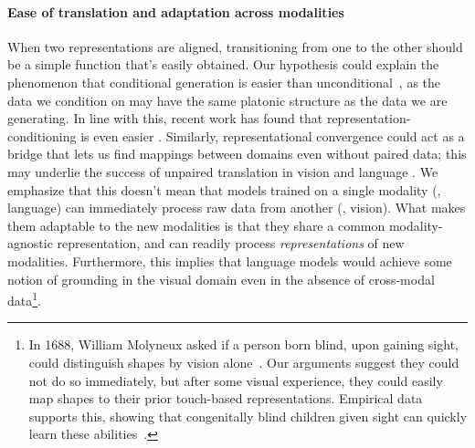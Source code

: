 \documentclass{article}
\theoremstyle{plain}
\theoremstyle{definition}
\theoremstyle{remark}
\begin{document}
\paragraph{Ease of translation and adaptation across modalities}
When two representations are aligned, transitioning from one to the other should be a simple function that's easily obtained. Our hypothesis could explain the phenomenon that conditional generation is easier than unconditional~\citep{mirza2014conditional,liu2020selfconditioned,sauer2022styleganxl}, as the data we condition on may have the same platonic structure as the data we are generating. In line with this, recent work has found that representation-conditioning is even easier \citep{RCG2023}. Similarly, representational convergence could act as a bridge that lets us find mappings between domains even without paired data; this may underlie the success of unpaired translation in vision \citep{CycleGAN2017,shi2024diffusion,xie2022unsupervised} and language \citep{tranfeature2017tran,lample-etal-2018-phrase}. 
We emphasize that this doesn't mean that models trained on a single modality (\eg, language) can immediately process raw data from another (\eg, vision). What makes them adaptable to the new modalities is that they share a common modality-agnostic representation, and can readily process \emph{representations} of new modalities. 
Furthermore, this implies that language models would achieve some notion of grounding in the visual domain %
even in the absence of cross-modal data\footnote{
In 1688, William Molyneux asked if a person born blind, upon gaining sight, could distinguish shapes by vision alone~\citep{locke_molyneaux}. Our arguments suggest they could not do so immediately, but after some visual experience, they could easily map shapes to their prior touch-based representations. Empirical data supports this, showing that congenitally blind children given sight can quickly learn these abilities~\citep{held2011newly}. 
}.
\end{document}

